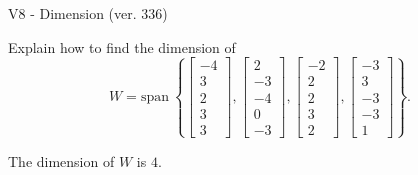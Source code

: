 \begin{exercise}
  \begin{exerciseTitle}V8 - Dimension (ver. 336)\end{exerciseTitle}
  \begin{exerciseStatement}
    Explain how to find the dimension of 
\[W=\mathrm{span}\ \left\{\left[\begin{array}{r}
-4 \\
3 \\
2 \\
3 \\
3
\end{array}\right] , \left[\begin{array}{r}
2 \\
-3 \\
-4 \\
0 \\
-3
\end{array}\right] , \left[\begin{array}{r}
-2 \\
2 \\
2 \\
3 \\
2
\end{array}\right] , \left[\begin{array}{r}
-3 \\
3 \\
-3 \\
-3 \\
1
\end{array}\right]\right\}.\]



  \end{exerciseStatement}
  \begin{exerciseAnswer}
   The dimension of \(W\) is  \(4\).
  


  \end{exerciseAnswer}
\end{exercise}